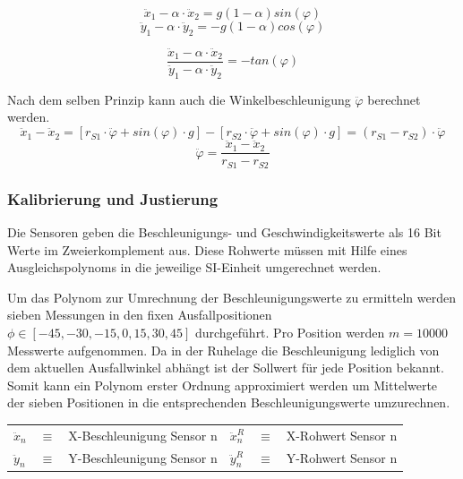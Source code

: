 \begin{equation}
\ddot{x}_1 - \alpha \cdot \ddot{x}_2 = 
g(1 - \alpha)sin(\varphi)
\end{equation}
\begin{equation}
\ddot{y}_1 - \alpha \cdot \ddot{y}_2 = 
-g(1- \alpha)cos(\varphi)
\end{equation}

\begin{equation}
\frac{\ddot{x}_1 - \alpha \cdot \ddot{x}_2}{\ddot{y}_1 - \alpha \cdot \ddot{y}_2} = -tan(\varphi)
\end{equation}

Nach dem selben Prinzip kann auch die Winkelbeschleunigung $\ddot{\varphi}$ berechnet werden.
\begin{equation}
\ddot{x}_1 - \ddot{x}_2 = [r_{S1} \cdot \ddot{\varphi} + sin(\varphi) \cdot g] - [r_{S2} \cdot \ddot{\varphi} + sin(\varphi) \cdot g] = (r_{S1} - r_{S2}) \cdot \ddot{\varphi}
\end{equation}
\begin{equation}
\ddot{\varphi} = \frac{\ddot{x}_1 - \ddot{x}_2}{r_{S1} - r_{S2}}
\end{equation}

\subsubsection{Kalibrierung und Justierung}
Die Sensoren geben die Beschleunigungs- und Geschwindigkeitswerte als 16 Bit Werte im Zweierkomplement aus. Diese Rohwerte müssen mit Hilfe eines Ausgleichspolynoms in die jeweilige SI-Einheit umgerechnet werden. 

Um das Polynom zur Umrechnung der Beschleunigungswerte zu ermitteln werden sieben Messungen in den fixen Ausfallpositionen $\phi \in [-45, -30, -15, 0, 15, 30, 45]$ durchgeführt. Pro Position werden $m = 10000$ Messwerte aufgenommen. Da in der Ruhelage die Beschleunigung lediglich von dem aktuellen Ausfallwinkel abhängt ist der Sollwert für jede Position bekannt. Somit kann ein Polynom erster Ordnung approximiert werden um Mittelwerte der sieben Positionen in die entsprechenden Beschleunigungswerte umzurechnen.

\begin{table}[h]
\centering
\begin{tabular}{lcllcl}
$\ddot{x}_n$ &$\equiv$& X-Beschleunigung Sensor n &
$\ddot{x}^R_n$ &$\equiv$& X-Rohwert Sensor n \\
$\ddot{y}_n$ &$\equiv$& Y-Beschleunigung Sensor n &
$\ddot{y}^R_n$ &$\equiv$& Y-Rohwert Sensor n
\end{tabular}
\end{table}

